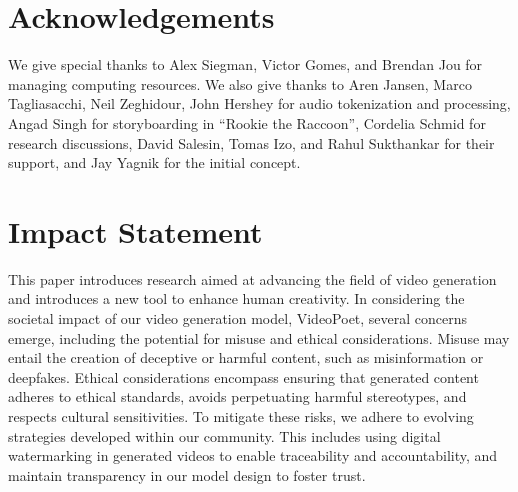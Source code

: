 \documentclass{article}
\begin{document}










\section*{Acknowledgements}
We give special thanks to Alex Siegman, Victor Gomes, and Brendan Jou for managing computing resources.
We also give thanks to Aren Jansen, Marco Tagliasacchi, Neil Zeghidour, John Hershey for audio tokenization and processing, Angad Singh for storyboarding in ``Rookie the Raccoon'', Cordelia Schmid for research discussions, David Salesin, Tomas Izo, and Rahul Sukthankar for their support, and Jay Yagnik for the initial concept.

\section*{Impact Statement}
This paper introduces research aimed at advancing the field of video generation and introduces a new tool to enhance human creativity. In considering the societal impact of our video generation model, VideoPoet, several concerns emerge, including the potential for misuse and ethical considerations. Misuse may entail the creation of deceptive or harmful content, such as misinformation or deepfakes. Ethical considerations encompass ensuring that generated content adheres to ethical standards, avoids perpetuating harmful stereotypes, and respects cultural sensitivities. To mitigate these risks, we adhere to evolving strategies developed within our community. This includes using digital watermarking in generated videos to enable traceability and accountability, and maintain transparency in our model design to foster trust.

{
    \small
    
    
}

\newpage
\appendix
\onecolumn


% 

%
\end{document}
